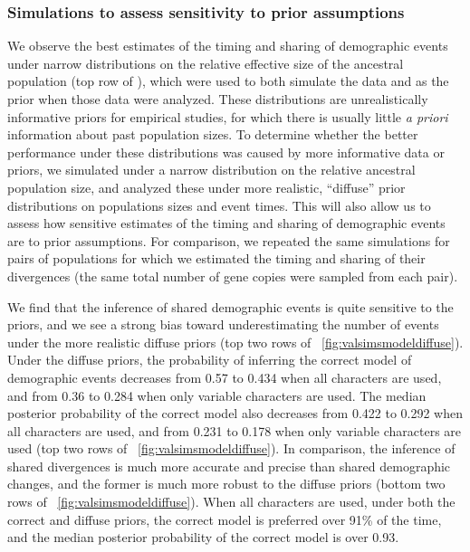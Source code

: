 \ifembed{

}{}

\ifembed{

}{}


\subsubsection{Simulations to assess sensitivity to prior assumptions}

We observe the best estimates of the timing and sharing of demographic
events under narrow distributions on the relative effective size of the
ancestral population
(top row of \figs
{}),
which were used to both simulate the data and as the prior
when those data were analyzed.
These distributions are unrealistically informative priors for empirical
studies, for which there is usually little \emph{a priori} information about
past population sizes.
To determine whether the better performance under these distributions was
caused by more informative data or priors, we simulated \datasets under a
narrow distribution on the relative ancestral population size, and analyzed
these \datasets under more realistic, ``diffuse'' prior distributions on
populations sizes and event times.
This will also allow us to assess how sensitive estimates of the timing and
sharing of demographic events are to prior assumptions.
For comparison, we repeated the same simulations for pairs of populations for
which we estimated the timing and sharing of their divergences (the same total
number of gene copies were sampled from each pair).


We find that the inference of shared demographic events is quite sensitive to
the priors, and we see a strong bias toward underestimating the number of
events under the more realistic diffuse priors
(top two rows of \fig{}~\ref{fig:valsimsmodeldiffuse}).
Under the diffuse priors, the probability of inferring the correct model of
demographic events decreases from 0.57 to 0.434 when all characters are used,
and from 0.36 to 0.284 when only variable characters are used.
The median posterior probability of the correct model also decreases from
0.422 to 0.292 when all characters are used,
and from 0.231 to 0.178 when only variable characters are used
(top two rows of \fig{}~\ref{fig:valsimsmodeldiffuse}).
In comparison, the inference of shared divergences is much more
accurate and precise than shared demographic changes, and
the former is much more robust to the diffuse priors
(bottom two rows of \fig{}~\ref{fig:valsimsmodeldiffuse}).
When all characters are used, under both the correct and diffuse
priors, the correct model is preferred over 91\% of the time,
and the median posterior probability of the correct model is over
0.93.

